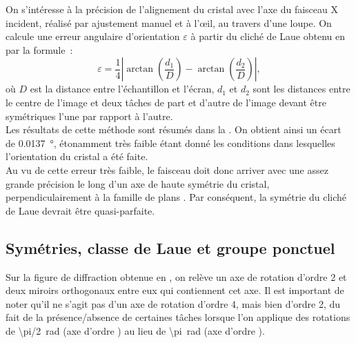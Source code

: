 On s'intéresse à la précision de l'alignement du cristal avec l'axe du faisceau X incident, réalisé par ajustement manuel et à l'œil, au travers d'une loupe.
On calcule une erreur angulaire d'orientation \(\varepsilon\) à partir du cliché de Laue obtenu en  par la formule~:
\begin{equation}
\varepsilon = \frac{1}{4} \left| \arctan\left( \frac{d_1}{D} \right) - \arctan\left(\frac{d_2}{D}\right) \right|,
\end{equation}
où \(D\) est la distance entre l'échantillon et l'écran, \(d_1\) et \(d_2\) sont les distances entre le centre de l'image et deux tâches de part et d'autre de l'image devant être symétriques l'une par rapport à l'autre.\\

Les résultats de cette méthode sont résumés dans la .
On obtient ainsi un écart de \SI{0.0137}{\degree}, étonamment très faible étant donné les conditions dans lesquelles l'orientation du cristal a été faite.\\
Au vu de cette erreur très faible, le faisceau doit donc arriver avec une assez grande précision le long d'un axe de haute symétrie du cristal, perpendiculairement à la famille de plans . Par conséquent, la symétrie du cliché de Laue devrait être quasi-parfaite.
%
\begin{table}
\caption{Mesures d'écart par rapport à la symétrie attendue et calcul de l'erreur d'alignement angulaire du cristal par rapport à l'axe de haute symétrie proche.}
\label{tab:LaueAngleError}
\end{table}
%

\subsection{Symétries, classe de Laue et groupe ponctuel}

Sur la figure de diffraction obtenue en , on relève un axe de rotation d'ordre 2 et deux miroirs orthogonaux entre eux qui contiennent cet axe.
Il est important de noter qu'il ne s'agit pas d'un axe de rotation d'ordre 4, mais bien d'ordre 2, du fait de la présence/absence de certaines tâches lorsque l'on applique des rotations de \SI{\pi/2}{\radian} (axe d'ordre ) au lieu de \SI{\pi}{\radian} (axe d'ordre ).

